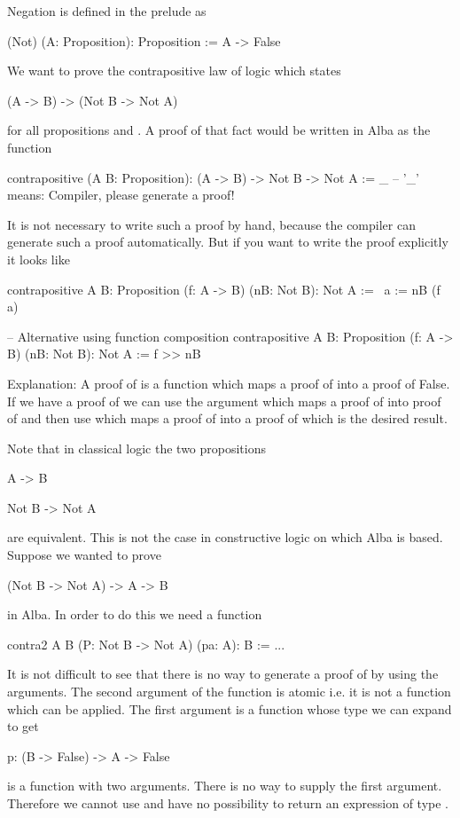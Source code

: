 Negation is defined in the prelude as
\begin{alba}
    (Not) (A: Proposition): Proposition :=
        A -> False
\end{alba}

We want to prove the contrapositive law of logic which states
\begin{alba}
    (A -> B) -> (Not B -> Not A)
\end{alba}
for all propositions  and . A proof of that fact would be
written in Alba as the function
%
\begin{alba}
  contrapositive (A B: Proposition): (A -> B) -> Not B -> Not A
  :=
    _      -- '_' means: Compiler, please generate a proof!
\end{alba}
%
It is not necessary to write such a proof by hand, because the compiler can
generate such a proof automatically. But if you want to write the proof
explicitly it looks like

\begin{alba}
    contrapositive {A B: Proposition} (f: A -> B) (nB: Not B): Not A
    :=
        \ a :=
            nB (f a)

    -- Alternative using function composition
    contrapositive {A B: Proposition} (f: A -> B) (nB: Not B): Not A
    :=
        f >> nB
\end{alba}

\noindent Explanation: A proof of  is a function which maps a proof
of  into a proof of False. If we have a proof of  we can use the
argument  which maps a proof of  into proof of
 and then use  which maps a proof of  into a proof
of  which is the desired result.



Note that in classical logic the two propositions
\begin{alba}
  A  ->  B

  Not B -> Not A
\end{alba}
%
are equivalent. This is not the case in constructive logic on which Alba is
based. Suppose we wanted to prove
%
\begin{alba}
  (Not B -> Not A) -> A -> B
\end{alba}
%
in Alba. In order to do this we need a function
\begin{alba}
  contra2 A B (P: Not B -> Not A) (pa: A): B :=
     ...
\end{alba}
%
It is not difficult to see that there is no way to generate a proof of 
by using the arguments. The second argument of the function is atomic i.e. it
is not a function which can be applied. The first argument is a function whose
type we can expand to get
\begin{alba}
    p: (B -> False) -> A -> False
\end{alba}
%
 is a function with two arguments. There is no way to supply the first
argument. Therefore we cannot use  and have no possibility to return
an expression of type .


